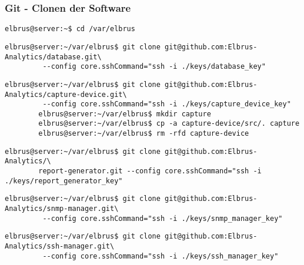 \documentclass{article}
\begin{document}
	\subsubsection{Git - Clonen der Software}
	\begin{lstlisting}[caption={Wechseln des Verzeichnisses.}]
		elbrus@server:~$ cd /var/elbrus
	\end{lstlisting}
	
	\begin{lstlisting}[caption={Clonen der Datenbank Software.}]
		elbrus@server:~/var/elbrus$ git clone git@github.com:Elbrus-Analytics/database.git\
		 --config core.sshCommand="ssh -i ./keys/database_key"
	\end{lstlisting}
	
	\begin{lstlisting}[caption={Clonen der Capture-Device Software.}]
		elbrus@server:~/var/elbrus$ git clone git@github.com:Elbrus-Analytics/capture-device.git\
		 --config core.sshCommand="ssh -i ./keys/capture_device_key"
		elbrus@server:~/var/elbrus$ mkdir capture
		elbrus@server:~/var/elbrus$ cp -a capture-device/src/. capture
		elbrus@server:~/var/elbrus$ rm -rfd capture-device
	\end{lstlisting}
	

	\begin{lstlisting}[caption={Clonen der Report-Generator Software.}]
		elbrus@server:~/var/elbrus$ git clone git@github.com:Elbrus-Analytics/\
		report-generator.git --config core.sshCommand="ssh -i ./keys/report_generator_key"
	\end{lstlisting}
	
	\newpage
	\begin{lstlisting}[caption={Clonen der SNMP-Manager Software.}]
		elbrus@server:~/var/elbrus$ git clone git@github.com:Elbrus-Analytics/snmp-manager.git\
		 --config core.sshCommand="ssh -i ./keys/snmp_manager_key"
	\end{lstlisting}

	\begin{lstlisting}[caption={Clonen der SSH-Manager Software.}]
		elbrus@server:~/var/elbrus$ git clone git@github.com:Elbrus-Analytics/ssh-manager.git\
		 --config core.sshCommand="ssh -i ./keys/ssh_manager_key"
	\end{lstlisting}
	
\end{document}
